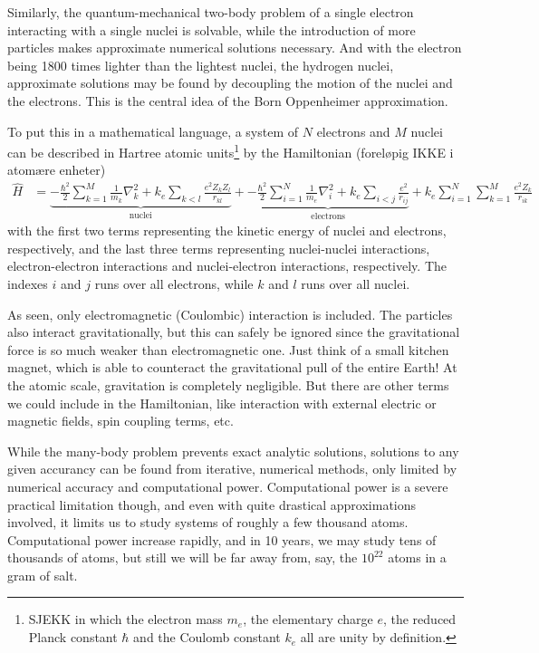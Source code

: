 \documentclass[11pt]{scrbook}   %
\begin{document}
Similarly, the quantum-mechanical two-body problem of a single electron interacting with a single nuclei is solvable, while the introduction of more particles makes approximate numerical solutions necessary. 
And with the electron being 1800 times lighter than the lightest nuclei, the hydrogen nuclei, approximate solutions may be found by decoupling the motion of the nuclei and the electrons. 
This is the central idea of the Born Oppenheimer approximation\cite{BO:1927}.

To put this in a mathematical language, a system of $N$ electrons and $M$ nuclei can be described in Hartree atomic units\footnote{SJEKK
in which the electron mass $m_e$, the elementary
charge $e$, the reduced Planck constant $\hbar$ and the Coulomb constant
$k_e$ all are unity by definition.
} by the Hamiltonian (foreløpig IKKE i atomære enheter)
\begin{align}
  \hat{H} &= 
	 \underbrace{
		- \frac{\hbar^2}{2}\sum_{k=1}^M \frac{1}{m_k}\nabla_k^2 
        + k_e \sum_{k<l}\frac{e^2Z_kZ_l}{r_{kl}}
		}_{\text{nuclei}}
  +
  \underbrace{
	-\frac{\hbar^2}{2}\sum_{i=1}^N\frac{1}{m_e}\nabla_i^2
	+ k_e  \sum_{i<j}\frac{e^2}{r_{ij}}
	}_{\text{electrons}}
		+ k_e \sum_{i=1}^N\sum_{k=1}^M \frac{e^2Z_k}{r_{ik}}
  \label{eq:mol-hamiltonian}
\end{align}
with the first two terms representing the kinetic energy of nuclei and electrons, respectively, 
and the last three terms representing nuclei-nuclei interactions, electron-electron interactions
and nuclei-electron interactions, respectively.
The indexes $i$ and $j$ runs over all electrons, while $k$ and $l$ runs over all nuclei. 

As seen, only electromagnetic (Coulombic) interaction is included. 
The particles also interact gravitationally, but this can safely be ignored since the gravitational force is so much weaker than electromagnetic one.
Just think of a small kitchen magnet, which is able to counteract the gravitational pull of the entire Earth!
At the atomic scale, gravitation is completely negligible. But there are
other terms we could include in the Hamiltonian, like interaction with external electric or magnetic fields, spin coupling terms, etc.

While the many-body problem prevents exact analytic solutions, solutions to any given accurancy can be found from iterative, numerical methods, only limited by numerical accuracy and computational power. Computational power is a severe practical limitation though, and even with quite drastical approximations involved, it limits us to study systems of roughly a few thousand atoms. Computational power increase rapidly, and in 10 years, we may study tens of thousands of atoms, but still we will be far away from, say, the $10^{22}$ atoms in a gram of salt.
\end{document}
